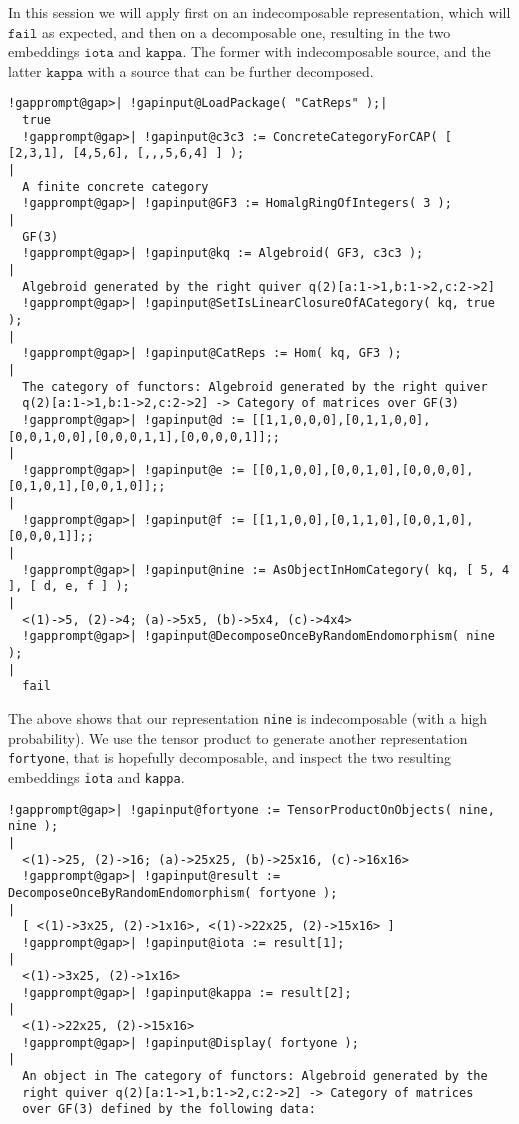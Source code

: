 \begin{computation} \label{comp:decompose_once}
In this \Gap{} session we will apply 
first on an indecomposable representation, which will $\mathtt{fail}$ as expected, and then on a decomposable one,
resulting in the two embeddings $\mathtt{iota}$ and $\mathtt{kappa}$. The former with indecomposable source,
and the latter $\mathtt{kappa}$ with a source that can be further decomposed.\\

\begin{Verbatim}[commandchars=!@|,fontsize=\small,frame=single,label=Example]
  !gapprompt@gap>| !gapinput@LoadPackage( "CatReps" );|
  true
  !gapprompt@gap>| !gapinput@c3c3 := ConcreteCategoryForCAP( [ [2,3,1], [4,5,6], [,,,5,6,4] ] );
|
  A finite concrete category
  !gapprompt@gap>| !gapinput@GF3 := HomalgRingOfIntegers( 3 );
|
  GF(3)
  !gapprompt@gap>| !gapinput@kq := Algebroid( GF3, c3c3 );
|
  Algebroid generated by the right quiver q(2)[a:1->1,b:1->2,c:2->2]
  !gapprompt@gap>| !gapinput@SetIsLinearClosureOfACategory( kq, true );
|
  !gapprompt@gap>| !gapinput@CatReps := Hom( kq, GF3 );
|
  The category of functors: Algebroid generated by the right quiver
  q(2)[a:1->1,b:1->2,c:2->2] -> Category of matrices over GF(3)
  !gapprompt@gap>| !gapinput@d := [[1,1,0,0,0],[0,1,1,0,0],[0,0,1,0,0],[0,0,0,1,1],[0,0,0,0,1]];;
|
  !gapprompt@gap>| !gapinput@e := [[0,1,0,0],[0,0,1,0],[0,0,0,0],[0,1,0,1],[0,0,1,0]];;
|
  !gapprompt@gap>| !gapinput@f := [[1,1,0,0],[0,1,1,0],[0,0,1,0],[0,0,0,1]];;
|
  !gapprompt@gap>| !gapinput@nine := AsObjectInHomCategory( kq, [ 5, 4 ], [ d, e, f ] );
|
  <(1)->5, (2)->4; (a)->5x5, (b)->5x4, (c)->4x4>
  !gapprompt@gap>| !gapinput@DecomposeOnceByRandomEndomorphism( nine );
|
  fail
\end{Verbatim}
 The above shows that our representation \texttt{nine} is indecomposable (with a high probability). We use the tensor product to generate another
representation \texttt{fortyone}, that is hopefully decomposable, and inspect the two resulting embeddings \texttt{iota} and \texttt{kappa}. 
\begin{Verbatim}[commandchars=!@|,fontsize=\small,frame=single,label=Example]
  !gapprompt@gap>| !gapinput@fortyone := TensorProductOnObjects( nine, nine );
|
  <(1)->25, (2)->16; (a)->25x25, (b)->25x16, (c)->16x16>
  !gapprompt@gap>| !gapinput@result := DecomposeOnceByRandomEndomorphism( fortyone );
|
  [ <(1)->3x25, (2)->1x16>, <(1)->22x25, (2)->15x16> ]
  !gapprompt@gap>| !gapinput@iota := result[1];
|
  <(1)->3x25, (2)->1x16>
  !gapprompt@gap>| !gapinput@kappa := result[2];
|
  <(1)->22x25, (2)->15x16>
  !gapprompt@gap>| !gapinput@Display( fortyone );
|
  An object in The category of functors: Algebroid generated by the
  right quiver q(2)[a:1->1,b:1->2,c:2->2] -> Category of matrices
  over GF(3) defined by the following data:
  

\end{Verbatim}
\end{computation}
